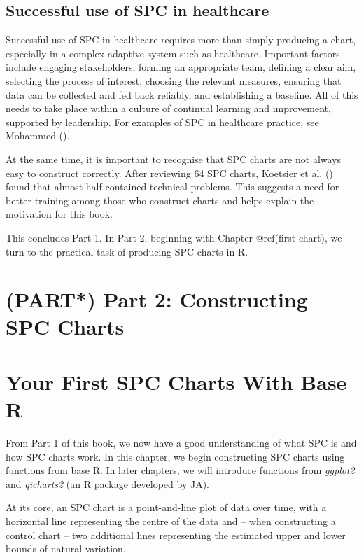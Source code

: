 \documentclass[
]{book}
\begin{document}
\section{Successful use of SPC in
healthcare}\label{successful-use-of-spc-in-healthcare}

Successful use of SPC in healthcare requires more than simply producing
a chart, especially in a complex adaptive system such as healthcare.
Important factors include engaging stakeholders, forming an appropriate
team, defining a clear aim, selecting the process of interest, choosing
the relevant measures, ensuring that data can be collected and fed back
reliably, and establishing a baseline. All of this needs to take place
within a culture of continual learning and improvement, supported by
leadership. For examples of SPC in healthcare practice, see Mohammed
().

At the same time, it is important to recognise that SPC charts are not
always easy to construct correctly. After reviewing 64 SPC charts,
Koetsier et al. () found that almost
half contained technical problems. This suggests a need for better
training among those who construct charts and helps explain the
motivation for this book.

This concludes Part 1. In Part 2, beginning with Chapter
@ref(first-chart), we turn to the practical task of producing SPC charts
in R.

\chapter*{(PART*) Part 2: Constructing SPC
Charts}\label{part-part-2-constructing-spc-charts}

\chapter{Your First SPC Charts With Base R}\label{first-chart}

From Part 1 of this book, we now have a good understanding of what SPC
is and how SPC charts work. In this chapter, we begin constructing SPC
charts using functions from base R. In later chapters, we will introduce
functions from \emph{ggplot2} and \emph{qicharts2} (an R package
developed by JA).

At its core, an SPC chart is a point-and-line plot of data over time,
with a horizontal line representing the centre of the data and -- when
constructing a control chart -- two additional lines representing the
estimated upper and lower bounds of natural variation.
\end{document}
